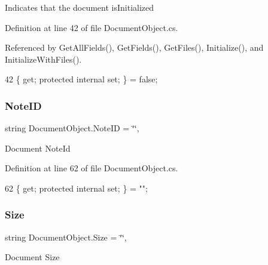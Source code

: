 Indicates that the document is\+Initialized 



Definition at line 42 of file Document\+Object.\+cs.



Referenced by Get\+All\+Fields(), Get\+Fields(), Get\+Files(), Initialize(), and Initialize\+With\+Files().


\begin{DoxyCode}
42 \{ \textcolor{keyword}{get}; \textcolor{keyword}{protected} \textcolor{keyword}{internal} \textcolor{keyword}{set}; \} = \textcolor{keyword}{false};
\end{DoxyCode}
\mbox{\label{class_document_object_ac447461e3dc7f8258695f902ef0758a7}} 
\subsubsection{\texorpdfstring{Note\+ID}{NoteID}}
{\footnotesize\ttfamily string Document\+Object.\+Note\+ID = \char`\"{}\char`\"{}\hspace{0.3cm}{\ttfamily [get]}, {\ttfamily [set]}}



Document Note\+Id 



Definition at line 62 of file Document\+Object.\+cs.


\begin{DoxyCode}
62 \{ \textcolor{keyword}{get}; \textcolor{keyword}{protected} \textcolor{keyword}{internal} \textcolor{keyword}{set}; \} = \textcolor{stringliteral}{""};
\end{DoxyCode}
\mbox{\label{class_document_object_abdc1a6dfc1bb2261b523cf94468448b9}} 
\subsubsection{\texorpdfstring{Size}{Size}}
{\footnotesize\ttfamily string Document\+Object.\+Size = \char`\"{}\char`\"{}\hspace{0.3cm}{\ttfamily [get]}, {\ttfamily [set]}}



Document Size 



